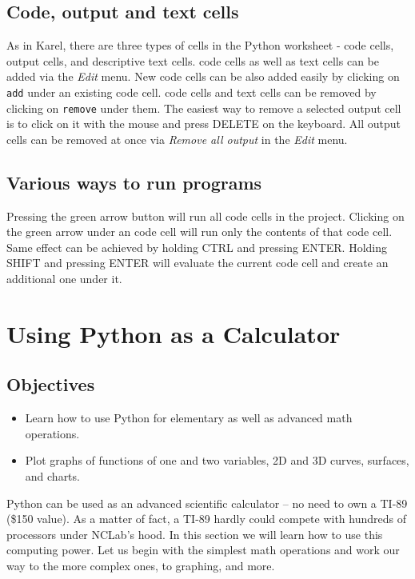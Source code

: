 \documentclass[article,A4,12pt]{llncs}
\begin{document}
\subsection{Code, output and text cells}

As in Karel, there are three types of cells in the Python worksheet - code cells, output cells, 
and descriptive text cells. code cells as well as text cells can be added via 
the {\em Edit} menu. New code cells can be also added easily by clicking on {\tt add} under
an existing code cell. code cells and text cells can be removed by clicking on 
{\tt remove} under them. The easiest way to remove a selected output cell is to 
click on it with the mouse and press DELETE on the keyboard. 
All output cells can be removed at once via {\em Remove all output} in the {\em Edit} menu. 

\subsection{Various ways to run programs}

Pressing the green arrow button will run all code cells in the project. Clicking 
on the green arrow under an code cell will run only the contents of that code cell. 
Same effect can be achieved by holding CTRL and pressing ENTER. Holding SHIFT
and pressing ENTER will evaluate the current code cell and create an additional one
under it.


\section{Using Python as a Calculator} \label{sec:calc}

\subsection{Objectives}

\begin{itemize}
\item Learn how to use Python for elementary as well as advanced math operations.
\item Plot graphs of functions of one and two variables, 2D and 
      3D curves, surfaces, and charts.
\end{itemize}
Python can be used as an advanced scientific calculator -- no need to own a TI-89 (\$150 value). 
As a matter of fact, a TI-89 hardly could compete with hundreds of processors under NCLab's hood. 
In this section we will learn how to use this computing power. Let us begin with the simplest math 
operations and work our way to the more complex ones, to graphing, and more. 
\end{document}
